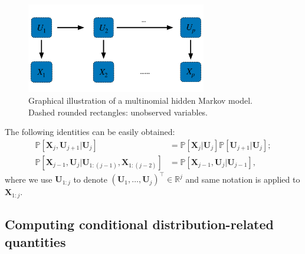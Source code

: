 \documentclass[12pt]{article}
\theoremstyle{definition}
\def\P{\mathbb{P}}
\def\P{\mathbb{P}}
\renewcommand{\P}{\mathbb{P}}							%
\newcommand{\prx}{\bm X}								%
\newcommand{\pru}{{\bm U}}								%
\begin{document}
\begin{figure}[!ht]
	\centering
	\includegraphics[width=0.7\textwidth]{figures-and-tables/HMM/mHHM.pdf}
	\caption{Graphical illustration of a multinomial hidden Markov model. Dashed rounded rectangles: unobserved variables.}\label{fig:HHM}
\end{figure}
\noindent The following identities can be easily obtained:
\begin{align}
	\P[\prx_j,\pru_{j+1}|\pru_j]
	&\label{eq:factorization}\tag{CI} 
	=\P[\prx_j|\pru_j]\P[\pru_{j+1}|\pru_j];\\
	\P[\prx_{j-1},\pru_j|\pru_{1:(j-1)},\prx_{1:(j-2)}]
	&\label{eq:Markov}\tag{Markov}
	=\P[\prx_{j-1},\pru_{j}|\pru_{j-1}],
\end{align}
where we use $\pru_{1:j}$ to denote $(\pru_1,\ldots,\pru_j)^\top\in\mathbb{R}^j$ and same notation is applied to $\prx_{1:j}$.

\subsection{Computing conditional distribution-related quantities}\label{sec:computing_conditional_quantities}
\end{document}
